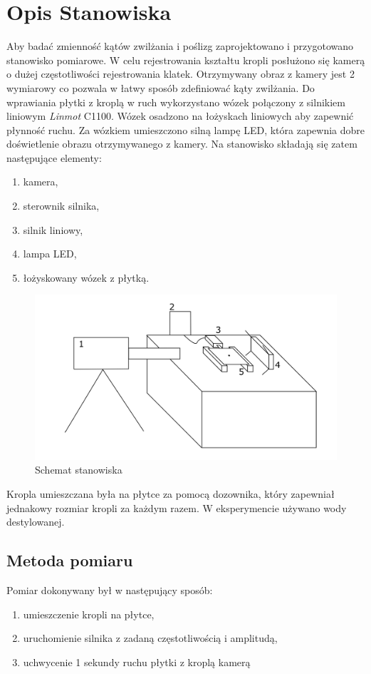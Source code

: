 \newpage

\section{Opis Stanowiska}
    Aby badać zmienność kątów zwilżania i poślizg zaprojektowano i przygotowano stanowisko pomiarowe. W celu rejestrowania kształtu kropli posłużono się kamerą o dużej częstotliwości rejestrowania klatek. Otrzymywany obraz z kamery jest 2 wymiarowy co pozwala w łatwy sposób zdefiniować kąty zwilżania. Do wprawiania płytki z kroplą w ruch wykorzystano wózek połączony z silnikiem liniowym \textit{Linmot} C1100. Wózek osadzono na łożyskach liniowych aby zapewnić płynność ruchu. Za wózkiem umieszczono silną lampę LED, która zapewnia dobre doświetlenie obrazu otrzymywanego z kamery. Na stanowisko składają się zatem następujące elementy:
    \begin{enumerate}
        \item kamera,
        \item sterownik silnika,
        \item silnik liniowy,
        \item lampa LED,
        \item łożyskowany wózek z płytką.
    \end{enumerate}

\begin{figure}[!h]
    \label{fig:poślizg}
    \centering \includegraphics[width=\linewidth]{img/stan.png}
    \caption{Schemat stanowiska}
\end{figure}

Kropla umieszczana była na płytce za pomocą dozownika, który zapewniał jednakowy rozmiar kropli za każdym razem. W eksperymencie używano wody destylowanej.

\newpage
\subsection{Metoda pomiaru}
\noindent Pomiar dokonywany był w następujący sposób:
\begin{enumerate}
    \item umieszczenie kropli na płytce,
    \item uruchomienie silnika z zadaną częstotliwością i amplitudą,
    \item uchwycenie 1 sekundy ruchu płytki z kroplą kamerą
\end{enumerate}

